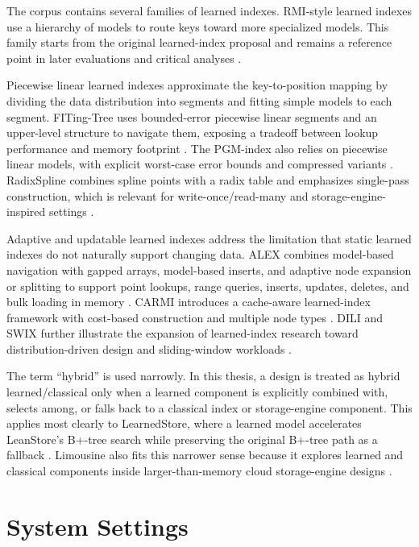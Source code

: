 \documentclass[a4paper, 12pt, twoside]{report}
\begin{document}
The corpus contains several families of learned indexes. RMI-style learned indexes use a hierarchy of models to route keys toward more specialized models. This family starts from the original learned-index proposal and remains a reference point in later evaluations and critical analyses \cite{kraska2018,maltry2022critical,sun2023learned}.

Piecewise linear learned indexes approximate the key-to-position mapping by dividing the data distribution into segments and fitting simple models to each segment. FITing-Tree uses bounded-error piecewise linear segments and an upper-level structure to navigate them, exposing a tradeoff between lookup performance and memory footprint \cite{galakatos2019fiting}. The PGM-index also relies on piecewise linear models, with explicit worst-case error bounds and compressed variants \cite{ferragina2020pgm}. RadixSpline combines spline points with a radix table and emphasizes single-pass construction, which is relevant for write-once/read-many and storage-engine-inspired settings \cite{kipf2020radixspline}.

Adaptive and updatable learned indexes address the limitation that static learned indexes do not naturally support changing data. ALEX combines model-based navigation with gapped arrays, model-based inserts, and adaptive node expansion or splitting to support point lookups, range queries, inserts, updates, deletes, and bulk loading in memory \cite{ding2020alex}. CARMI introduces a cache-aware learned-index framework with cost-based construction and multiple node types \cite{zhang2022carmi}. DILI and SWIX further illustrate the expansion of learned-index research toward distribution-driven design and sliding-window workloads \cite{li2023dili,liang2024swix}.

The term ``hybrid'' is used narrowly. In this thesis, a design is treated as hybrid learned/classical only when a learned component is explicitly combined with, selects among, or falls back to a classical index or storage-engine component. This applies most clearly to LearnedStore, where a learned model accelerates LeanStore's B+-tree search while preserving the original B+-tree path as a fallback \cite{maharjan2023learnedstore}. Limousine also fits this narrower sense because it explores learned and classical components inside larger-than-memory cloud storage-engine designs \cite{chatterjee2024limousine}.

\section{System Settings}
\end{document}
